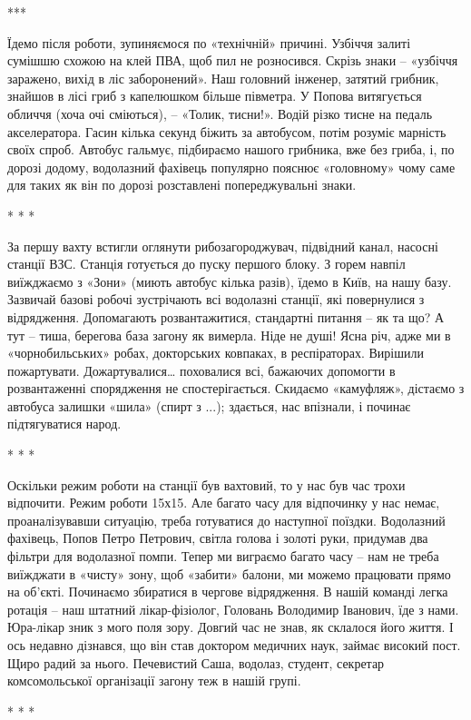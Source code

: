 ***

Їдемо після роботи, зупиняємося по «технічній» причині. Узбіччя залиті сумішшю
схожою на клей ПВА, щоб пил не розносився. Скрізь знаки – «узбіччя заражено,
вихід в ліс заборонений». Наш головний інженер, затятий грибник, знайшов в лісі
гриб з капелюшком більше півметра. У Попова витягується обличчя (хоча очі
сміються), – «Толик, тисни!». Водій різко тисне на педаль акселератора. Гасин
кілька секунд біжить за автобусом, потім розуміє марність своїх спроб. Автобус
гальмує, підбираємо нашого грибника, вже без гриба, і, по дорозі додому,
водолазний фахівець популярно пояснює «головному» чому саме для таких як він по
дорозі розставлені попереджувальні знаки.

* * *

За першу вахту встигли оглянути рибозагороджувач, підвідний канал, насосні
станції ВЗС. Станція готується до пуску першого блоку. З горем навпіл
виїжджаємо з «Зони» (миють автобус кілька разів), їдемо в Київ, на нашу базу.
Зазвичай базові робочі зустрічають всі водолазні станції, які повернулися з
відрядження. Допомагають розвантажитися, стандартні питання – як та що? А тут –
тиша, берегова база загону як вимерла. Ніде не душі! Ясна річ, адже ми в
«чорнобильських» робах, докторських ковпаках, в респіраторах. Вирішили
пожартувати. Дожартувалися… поховалися всі, бажаючих допомогти в розвантаженні
спорядження не спостерігається. Скидаємо «камуфляж», дістаємо з автобуса
залишки «шила» (спирт з ...); здається, нас впізнали, і починає підтягуватися
народ.

* * *

Оскільки режим роботи на станції був вахтовий, то у нас був час трохи
відпочити. Режим роботи 15х15. Але багато часу для відпочинку у нас немає,
проаналізувавши ситуацію, треба готуватися до наступної поїздки. Водолазний
фахівець, Попов Петро Петрович, світла голова і золоті руки, придумав два
фільтри для водолазної помпи. Тепер ми виграємо багато часу – нам не треба
виїжджати в «чисту» зону, щоб «забити» балони, ми можемо працювати прямо на
об'єкті. Починаємо збиратися в чергове відрядження. В нашій команді легка
ротація – наш штатний лікар-фізіолог, Головань Володимир Іванович, їде з нами.
Юра-лікар зник з мого поля зору. Довгий час не знав, як склалося його життя. І
ось недавно дізнався, що він став доктором медичних наук, займає високий пост.
Щиро радий за нього. Печевистий Саша, водолаз, студент, секретар комсомольської
організації загону теж в нашій групі.

* * *

